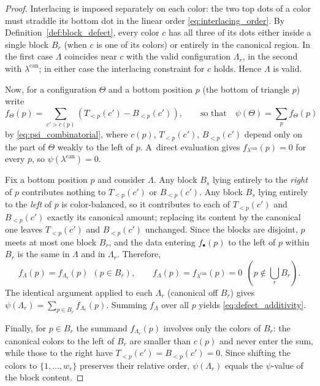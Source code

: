 \documentclass[pdftex]{sigma}
\numberwithin{equation}{section}
\theoremstyle{definition}
\begin{document}
\begin{proof}
	Interlacing is imposed separately on each color: the two
	top dots of a color must straddle its bottom dot in the linear order
	\eqref{eq:interlacing_order}. By Definition~\ref{def:block_defect}, every color $c$ has
	all three of its dots either inside a single block $B_r$ (when $c$ is one of
	its colors) or entirely in the canonical region. In the first case $\Lambda$
	coincides near $c$ with the valid configuration $\Lambda_r$, in the second
	with $\lambda^{\mathrm{can}}$; in either case the interlacing constraint for
	$c$ holds. Hence $\Lambda$ is valid.

	Now, for a configuration $\Theta$ and a bottom position $p$
	(the bottom of triangle $p$) write
\[
f_\Theta(p)=\sum_{c'>c(p)} (T_{<p}(c')-B_{<p}(c') ),
		\qquad\text{so that}\quad \psi(\Theta)=\sum_{p}f_\Theta(p)
\]
	by \eqref{eq:psi_combinatorial}, where $c(p)$, $T_{<p}(c')$, $B_{<p}(c')$
	depend only on the part of $\Theta$ weakly to the left of $p$. A~direct
	evaluation gives $f_{\lambda^{\mathrm{can}}}(p)=0$ for every $p$, so
	$\psi(\lambda^{\mathrm{can}})=0$.

	Fix a bottom position $p$ and consider $\Lambda$. Any block $B_s$ lying
	entirely to the \emph{right} of $p$ contributes nothing to $T_{<p}(c')$ or
	$B_{<p}(c')$. Any block $B_s$ lying entirely to the \emph{left} of $p$ is
	color-balanced, so it contributes to each of $T_{<p}(c')$ and $B_{<p}(c')$
	exactly its canonical amount; replacing its content by the canonical one
	leaves $T_{<p}(c')$ and $B_{<p}(c')$ unchanged. Since the blocks are disjoint,
	$p$ meets at most one block $B_r$, and the data entering $f_\bullet(p)$ to the
	left of $p$ within $B_r$ is the same in $\Lambda$ and in $\Lambda_r$.
	Therefore,
	\[
		f_{\Lambda}(p)=f_{\Lambda_r}(p)\ \ (p\in B_r),
		\qquad
		f_{\Lambda}(p)=f_{\lambda^{\mathrm{can}}}(p)=0\ \ (p\notin\textstyle\bigcup_r B_r).
	\]
	The identical argument applied to each $\Lambda_r$ (canonical off $B_r$)
	gives $\psi(\Lambda_r)=\sum_{p\in B_r}f_{\Lambda_r}(p)$. Summing
	$f_{\Lambda}$ over all $p$ yields \eqref{eq:defect_additivity}.

	Finally, for $p\in B_r$ the summand $f_{\Lambda_r}(p)$ involves only
	the colors of $B_r$: the canonical colors to the left of $B_r$ are
	smaller than $c(p)$ and never enter the sum, while those to the right
	have $T_{<p}(c')=B_{<p}(c')=0$. Since shifting the colors to
	$\{1,\dots,w_r\}$ preserves their relative order, $\psi(\Lambda_r)$
	equals the $\psi$-value of the block content.
\end{proof}
\end{document}
